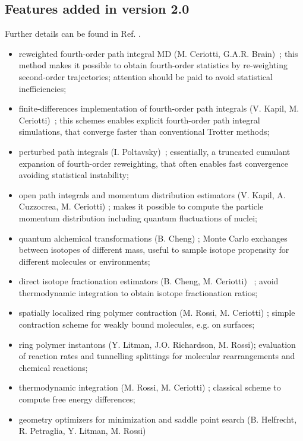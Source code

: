 \documentclass[11pt,english,fleqn]{report}
\begin{document}
\subsection{Features added in version 2.0}

Further details can be found in Ref. \cite{Kapil:2019ju}.

\begin{itemize}
\item reweighted fourth-order path integral MD (M. Ceriotti, G.A.R. Brain)~\cite{ceri+12prsa,jang-voth01jcp}; {this method makes it possible to obtain fourth-order statistics by re-weighting second-order trajectories; attention should be paid to avoid statistical inefficiencies;}
\item finite-differences implementation of fourth-order path integrals (V. Kapil, M. Ceriotti)~\cite{kapi+16jcp2}; {this schemes enables explicit fourth-order path integral simulations, that converge faster than conventional Trotter methods};
\item perturbed path integrals (I. Poltavsky)~\cite{polt-tkat16cs}; {essentially, a truncated cumulant expansion of fourth-order reweighting, that often enables fast convergence avoiding statistical instability; }
\item open path integrals and momentum distribution estimators (V. Kapil, A. Cuzzocrea, M. Ceriotti) \cite{kapi+18jpcb}; {makes it possible to compute the particle momentum distribution including quantum fluctuations of nuclei;} 
\item quantum alchemical transformations (B. Cheng) \cite{liu+13jpcc,chen+16jpcl}; {Monte Carlo exchanges between isotopes of different mass, useful to sample isotope propensity for different molecules or environments;}
\item direct isotope fractionation estimators (B. Cheng, M. Ceriotti) ~\cite{chen-ceri14jcp}; {avoid thermodynamic integration to obtain isotope fractionation ratios;}
\item spatially localized ring polymer contraction (M. Rossi, M. Ceriotti) \cite{litm+17jcp}; {simple contraction scheme for weakly bound molecules, e.g. on surfaces;}
\item ring polymer instantons (Y. Litman, J.O. Richardson, M. Rossi); {evaluation of reaction rates and tunnelling splittings for molecular rearrangements and chemical reactions;}
\item thermodynamic integration (M. Rossi, M. Ceriotti) \cite{ross+16prl}; {classical scheme to compute free energy differences;}
\item geometry optimizers for minimization and saddle point search (B. Helfrecht, R. Petraglia, Y. Litman, M. Rossi) \cite{ross+16prl}

\end{itemize}
\end{document}
